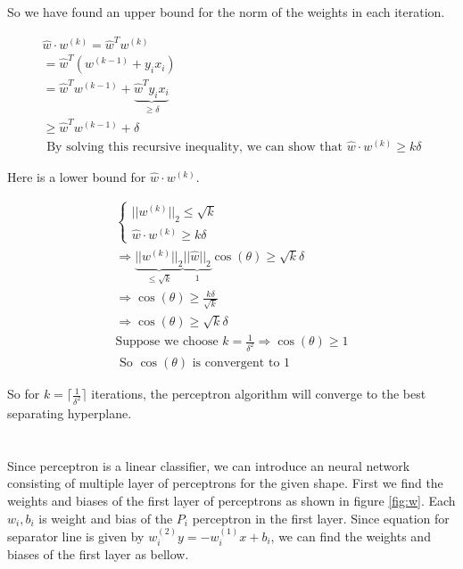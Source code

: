 \documentclass[en]{university}
\begin{document}
So we have found an upper bound for the norm of the weights in each iteration.

\begin{gather*}
    \hat{w} \cdot w^{(k)} = \hat{w}^T w^{(k)} \\
    = \hat{w}^T (w^{(k-1)} + y_i x_i) \\
    = \hat{w}^T w^{(k-1)} + \underbrace{\hat{w}^T y_i x_i}_{\geq \delta} \\
    \geq \hat{w}^T w^{(k-1)} + \delta \\
    \text{ By solving this recursive inequality, we can show that } \hat{w} \cdot w^{(k)} \geq k \delta 
\end{gather*}

Here is a lower bound for $\hat{w} \cdot w^{(k)}$.

\begin{gather*}
    \begin{cases}
        ||w^{(k)}||_2 \leq \sqrt{k} \\
        \hat{w} \cdot w^{(k)} \geq k \delta 
    \end{cases} \\
    \Rightarrow \underbrace{||w^{(k)}||_2}_{\leq \sqrt{k}} \underbrace{||\hat{w}||_2}_{1} \cos(\theta) \geq \sqrt{k} \delta \\
    \Rightarrow \cos(\theta) \geq \frac{k \delta}{\sqrt{k}} \\
    \Rightarrow \cos(\theta) \geq \sqrt{k} \delta \\
    \text{Suppose we choose } k = \frac{1}{\delta^2} \Rightarrow \cos(\theta) \geq 1 \\
    \text{ So } \cos(\theta) \text{ is convergent to } 1
\end{gather*}

So for $k = \lceil \frac{1}{\delta^2} \rceil$ iterations, the perceptron algorithm will converge to the best separating hyperplane.

\section{}

Since perceptron is a linear classifier, we can introduce an neural network consisting of multiple layer of perceptrons for the given shape. 
First we find the weights and biases of the first layer of perceptrons as shown in figure \ref{fig:w}. Each $w_i, b_i$ is weight and bias 
of the $P_i$ perceptron in the first layer. Since equation for separator line is given by $w_i^(2) y = -w_i^(1) x + b_i$, we can find the weights
and biases of the first layer as bellow.
\end{document}

